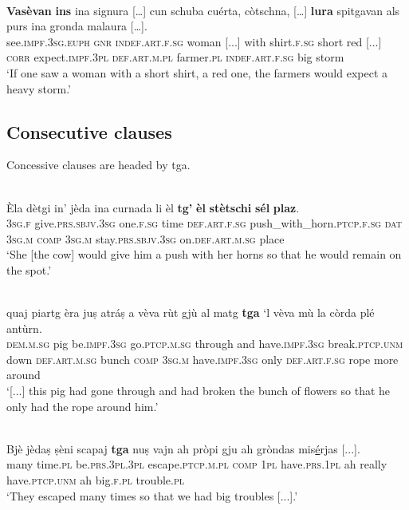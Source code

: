 \ea
\label{ex:cond6}
\\
\gll    \textbf{Vasèvan} \textbf{ins} ina signura […] cun schuba cuérta, còtschna, […] \textbf{lura} spitgavan als purs ina gronda malaura […].\\
     see.\textsc{impf.3sg.euph} \textsc{gnr} \textsc{indef.art.f.sg} woman [...] with shirt.\textsc{f.sg} short red [...] \textsc{corr} expect.\textsc{impf.3pl} \textsc{def.art.m.pl} farmer.\textsc{pl} \textsc{indef.art.f.sg} big storm\\
\glt `If one saw a woman with a short shirt, a red one, the farmers would expect a heavy storm.'
\z

\subsection{Consecutive clauses}
Concessive clauses are headed by tga.

\ea
\label{}
\\
\gll  Èla dètgi in' jèda ina curnada li èl \textbf{tg’} \textbf{èl} \textbf{stètschi} \textbf{sél} \textbf{plaz}.\\
\textsc{3sg.f} give.\textsc{prs.sbjv.3sg} one.\textsc{f.sg} time \textsc{def.art.f.sg} push\_with\_horn.\textsc{ptcp.f.sg} \textsc{dat} \textsc{3sg.m} \textsc{comp} \textsc{3sg.m} stay.\textsc{prs.sbjv.3sg} on.\textsc{def.art.m.sg} place \\
\glt `She [the cow] would give him a push with her horns so that he would remain on the spot.'
\z

\ea\label{}
\\
	\gll    [...] quaj piartg èra juṣ atráṣ a vèva rùt gjù al matg \textbf{tga}  `l vèva mù la còrda plé antùrn.\\
{} \textsc{dem.m.sg} pig be.\textsc{impf.3sg} go.\textsc{ptcp.m.sg} through and have.\textsc{impf.3sg} break.\textsc{ptcp.unm} down \textsc{def.art.m.sg} bunch  \textsc{comp} \textsc{3sg.m} have.\textsc{impf.3sg} only \textsc{def.art.f.sg} rope more around\\
\glt `[...] this pig had gone through and had broken the bunch of flowers so that he only had the rope around him.'
\z

\ea
\label{}
\\
\gll  Bjè jèdaṣ ṣèni scapaj \textbf{tga} nuṣ vajn ah pròpi gju ah gròndas mis\underline{é}rjas [...].\\
many time.\textsc{pl} be.\textsc{prs.3pl.3pl} escape.\textsc{ptcp.m.pl} \textsc{comp} \textsc{1pl}   have.\textsc{prs.1pl} ah really have.\textsc{ptcp.unm} ah big.\textsc{f.pl} trouble.\textsc{pl}\\
\glt `They escaped many times so that we had big troubles [...].'
\z

